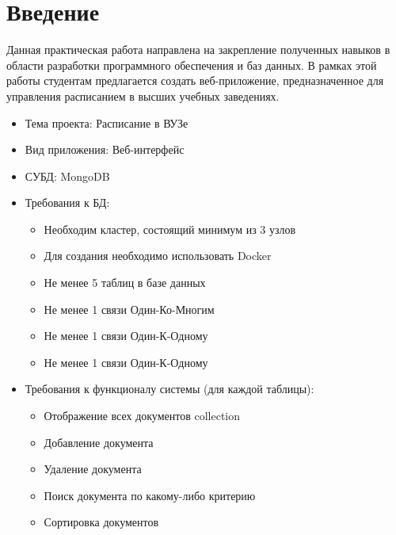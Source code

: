 \section*{\LARGE Введение}

Данная практическая работа направлена на закрепление полученных навыков
в области разработки программного обеспечения и баз данных.
В рамках этой работы студентам предлагается создать веб-приложение,
предназначенное для управления расписанием в высших учебных заведениях.

\begin{itemize}
	\item Тема проекта: Расписание в ВУЗе
	\item Вид приложения: Веб-интерфейс
	\item СУБД: MongoDB
	\item Требования к БД:
	\begin{itemize}
		\item Необходим кластер, состоящий минимум из 3 узлов
		\item Для создания необходимо использовать Docker
		\item Не менее 5 таблиц в базе данных
		\item Не менее 1 связи Один-Ко-Многим
		\item Не менее 1 связи Один-К-Одному
		\item Не менее 1 связи Один-К-Одному
	\end{itemize}
	\item Требования к функционалу системы (для каждой таблицы):
	\begin{itemize}
		\item Отображение всех документов collection
		\item Добавление документа
		\item Удаление документа
		\item Поиск документа по какому-либо критерию
		\item Сортировка документов
	\end{itemize}
\end{itemize}

